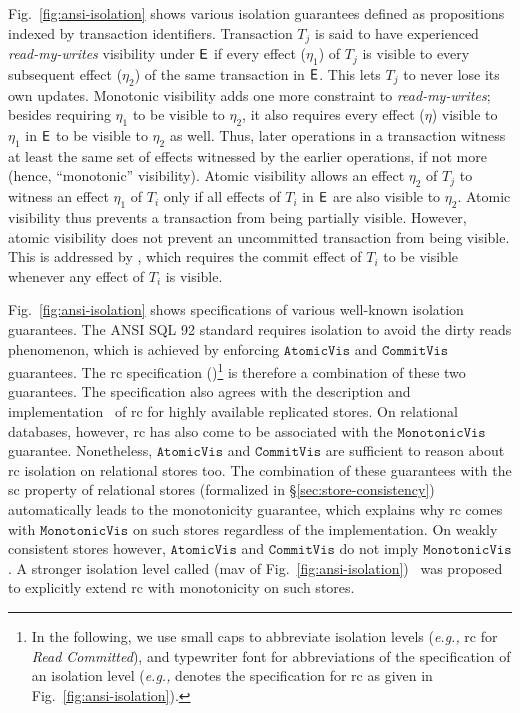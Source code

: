 Fig.~\ref{fig:ansi-isolation} shows various isolation guarantees
defined as propositions indexed by transaction identifiers.
Transaction $T_j$ is said to have experienced \emph{read-my-writes}
visibility under $\textsf{E}$ if every effect ($\eta_1$) of $T_j$ is visible
to every subsequent effect ($\eta_2$) of the same transaction in $\textsf{E}$.
This lets $T_j$ to never lose its own updates. Monotonic visibility
adds one more constraint to \emph{read-my-writes}; besides requiring $\eta_1$
to be visible to $\eta_2$, it also requires every effect ($\eta$)
visible to $\eta_1$ in $\textsf{E}$ to be visible to $\eta_2$ as well. Thus,
later operations in a transaction witness at least the same set of
effects witnessed by the earlier operations, if not more (hence,
``monotonic'' visibility). Atomic visibility allows an effect
$\eta_2$ of $T_j$ to witness an effect $\eta_1$ of $T_i$ only if all
effects of $T_i$ in $\textsf{E}$ are also visible to $\eta_2$. Atomic
visibility thus prevents a transaction from being partially visible.
However, atomic visibility does not prevent an uncommitted transaction
from being visible. This is addressed by , which requires
the commit effect of $T_i$ to be visible whenever any effect of $T_i$
is visible.

Fig.~\ref{fig:ansi-isolation} shows specifications of various
well-known isolation guarantees.  The ANSI SQL 92 standard requires
 isolation to avoid the dirty reads phenomenon,
which is achieved by enforcing $\mathtt{AtomicVis}$ and
$\mathtt{CommitVis}$ guarantees. The {\sc rc} specification
()\footnote{In the following, we use small caps to abbreviate
isolation levels (\emph{e.g.,} {\sc rc} for \emph{Read Committed}),
and typewriter font for abbreviations of the specification of an
isolation level (\emph{e.g.,}  denotes the specification for
{\sc rc} as given in Fig.~\ref{fig:ansi-isolation}).} is therefore a
combination of these two guarantees. The specification also agrees
with the description and implementation~\cite{bailishat,pldi15} of
{\sc rc} for highly available replicated stores. On relational
databases, however, {\sc rc} has also come to be associated with the
$\mathtt{MonotonicVis}$ guarantee.  Nonetheless, $\mathtt{AtomicVis}$
and $\mathtt{CommitVis}$ are sufficient to reason about {\sc rc}
isolation on relational stores too. The combination of these
guarantees with the {\sc sc} property of relational stores (formalized
in \S\ref{sec:store-consistency}) automatically leads to the
monotonicity guarantee, which explains why {\sc rc} comes with
$\mathtt{MonotonicVis}$ on such stores regardless of the
implementation. On weakly consistent stores however,
$\mathtt{AtomicVis}$ and $\mathtt{CommitVis}$ do not imply
$\mathtt{MonotonicVis}$. A stronger isolation level called
 ({\sc mav} of
Fig.~\ref{fig:ansi-isolation})~\cite{bailishat} was proposed to
explicitly extend {\sc rc} with monotonicity on such stores. 


